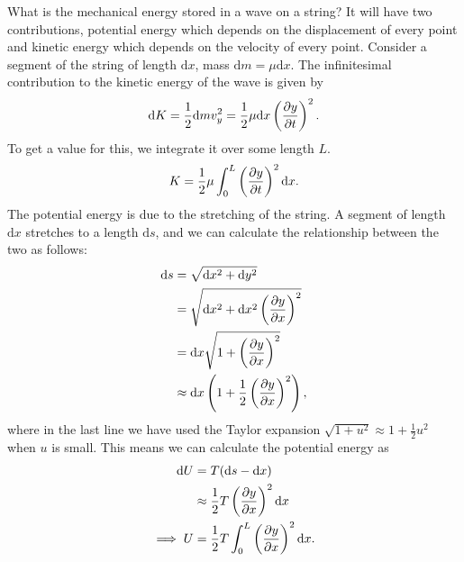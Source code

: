 \documentclass[../classical_mechanics.tex]{subfiles}
\begin{document}
        What is the mechanical energy stored in a wave on a string?
        It will have two contributions, potential energy which depends on the displacement of every point and kinetic energy which depends on the velocity of every point.
        Consider a segment of the string of length $\mathrm{d}x$, mass $\mathrm{d}m=\mu\mathrm{d}x$.
        The infinitesimal contribution to the kinetic energy of the wave is given by
        \begin{equation}
            \mathrm{d}K=\frac{1}{2}\mathrm{d}mv_y^2=\frac{1}{2}\mu\mathrm{d}x\left(\pdv{y}{t}\right)^2.
        \end{equation}
        To get a value for this, we integrate it over some length $L$.
        \begin{equation}
            K=\frac{1}{2}\mu\int_{0}^{L}\left(\pdv{y}{t}\right)^2\mathrm{d}x.
        \end{equation}
        The potential energy is due to the stretching of the string.
        A segment of length $\mathrm{d}x$ stretches to a length $\mathrm{d}s$, and we can calculate the relationship between the two as follows:
        \begin{align}
            \mathrm{d}s&=\sqrt{\mathrm{d}x^2+\mathrm{d}y^2}\\
            &=\sqrt{\mathrm{d}x^2+\mathrm{d}x^2\left(\pdv{y}{x}\right)^2}\\
            &=\mathrm{d}x\sqrt{1+\left(\pdv{y}{x}\right)^2}\\
            &\approx\mathrm{d}x\left(1+\frac{1}{2}\left(\pdv{y}{x}\right)^2\right),
        \end{align}
        where in the last line we have used the Taylor expansion $\sqrt{1+u^2}\approx 1+\frac{1}{2}u^2$ when $u$ is small.
        This means we can calculate the potential energy as
        \begin{align}
            \mathrm{d}U&=T(\mathrm{d}s-\mathrm{d}x)\\
            &\approx\frac{1}{2}T\left(\pdv{y}{x}\right)^2\mathrm{d}x\\
            \implies U&=\frac{1}{2}T\int_{0}^{L}\left(\pdv{y}{x}\right)^2\mathrm{d}x.
        \end{align}
\end{document}
